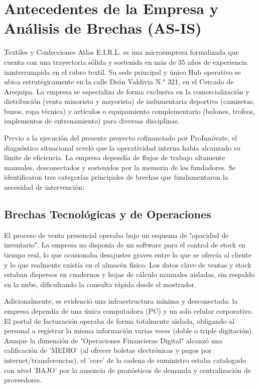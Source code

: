 \section{Antecedentes de la Empresa y Análisis de Brechas (AS-IS)}

Textiles y Confecciones Atlas E.I.R.L. es una microempresa formalizada que cuenta con una trayectoria sólida y sostenida en más de 35 años de experiencia ininterrumpida en el rubro textil. Su sede principal y único Hub operativo se ubica estratégicamente en la calle Deán Valdivia N.° 321, en el Cercado de Arequipa. La empresa se especializa de forma exclusiva en la comercialización y distribución (venta minorista y mayorista) de indumentaria deportiva (camisetas, buzos, ropa técnica) y artículos o equipamiento complementario (balones, trofeos, implementos de entrenamiento) para diversas disciplinas. 

Previo a la ejecución del presente proyecto cofinanciado por ProInnóvate, el diagnóstico situacional reveló que la operatividad interna había alcanzado su límite de eficiencia. La empresa dependía de flujos de trabajo altamente manuales, desconectados y sostenidos por la memoria de los fundadores. Se identificaron tres categorías principales de brechas que fundamentaron la necesidad de intervención:

\subsection{Brechas Tecnológicas y de Operaciones}
El proceso de venta presencial operaba bajo un esquema de "opacidad de inventario". La empresa no disponía de un software para el control de stock en tiempo real, lo que ocasionaba desajustes graves entre lo que se ofrecía al cliente y lo que realmente existía en el almacén físico. Los datos clave de ventas y stock estaban dispersos en cuadernos y hojas de cálculo manuales aisladas, sin respaldo en la nube, dificultando la consulta rápida desde el mostrador. 

Adicionalmente, se evidenció una infraestructura mínima y desconectada: la empresa dependía de una única computadora (PC) y un solo celular corporativo. El portal de facturación operaba de forma totalmente aislada, obligando al personal a registrar la misma información varias veces (doble o triple digitación). Aunque la dimensión de "Operaciones Financieras Digital" alcanzó una calificación de 'MEDIO' (al ofrecer boletas electrónicas y pagos por internet/transferencias), el 'core' de la cadena de suministro estaba catalogado con nivel 'BAJO' por la ausencia de pronósticos de demanda y centralización de proveedores.

